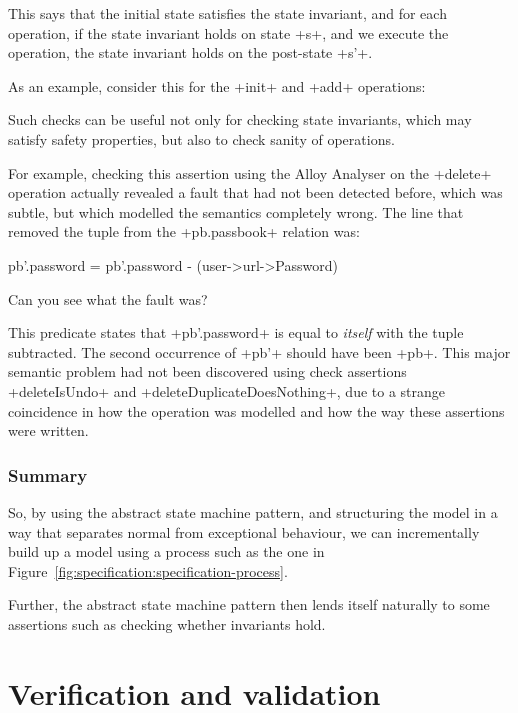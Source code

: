 This says that the initial state satisfies the state invariant, and for each operation, if the state invariant holds on state \A+s+, and we execute the operation, the state invariant holds on the post-state \A+s'+.

As an example, consider this for the \A+init+ and \A+add+ operations:


Such checks can be useful not only for checking state invariants, which may satisfy safety properties, but also to check sanity of operations.

For example, checking this assertion using the Alloy Analyser on the \A+delete+ operation actually revealed a fault that had not been detected before, which was subtle, but which modelled the semantics completely wrong. The line that removed the tuple from the \A+pb.passbook+ relation was:

\begin{alloy}
  pb'.password = pb'.password - (user->url->Password)
\end{alloy}

Can you see what the fault was?

This predicate states that \A+pb'.password+ is equal to \emph{itself} with the tuple subtracted. The second occurrence of \A+pb'+ should have been \A+pb+. This major semantic problem had not been discovered using check assertions  \A+deleteIsUndo+ and \A+deleteDuplicateDoesNothing+, due to a strange coincidence in how the operation was modelled and how the way these assertions were written.

\subsubsection{Summary}

So, by using the abstract state machine pattern, and structuring the model in a way that separates normal from exceptional behaviour, we can incrementally build up a model using a process such as the one in Figure~\ref{fig:specification:specification-process}.

Further, the abstract state machine pattern then lends itself naturally to some assertions such as checking whether invariants hold.

\section{Verification and validation}

